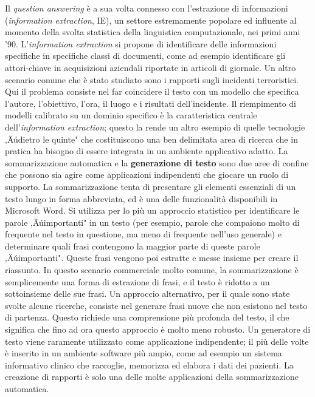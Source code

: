 \begin{multicols}{2}

Il \emph{question answering} \`{e} a sua volta connesso con l'estrazione di informazioni (\emph{information extraction}, IE), un settore estremamente popolare ed influente al momento della svolta statistica della linguistica computazionale, nei primi anni '90. L'\emph{information extraction} si propone di identificare delle informazioni specifiche in specifiche classi di documenti, come ad esempio identificare gli attori-chiave in acquisizioni aziendali riportate in articoli di giornale. Un altro scenario comune che \`{e} stato studiato sono i rapporti sugli incidenti terroristici. Qui il problema consiste nel far coincidere il testo con un modello che specifica l'autore, l'obiettivo, l'ora, il luogo e i risultati dell'incidente. Il riempimento di modelli calibrato su un dominio specifico \`{e} la caratteristica centrale dell'\emph{information extraction}; questo la rende un altro esempio di quelle tecnologie ‚Äúdietro le quinte" che costituiscono una ben delimitata area di ricerca che in pratica ha bisogno di essere integrata in un ambiente applicativo adatto.
La sommarizzazione automatica e la \textbf{generazione di testo} sono due aree di confine che possono sia agire come applicazioni indipendenti che giocare un ruolo di supporto. La sommarizzazione tenta di presentare gli elementi essenziali di un testo lungo in forma abbreviata, ed \`{e} una delle funzionalit\`{a} disponibili in Microsoft Word. Si utilizza per lo pi\`{u} un approccio statistico per identificare le parole ‚Äúimportanti" in un testo (per esempio, parole che compaiono molto di frequente nel testo in questione, ma meno di frequente nell'uso generale) e determinare quali frasi contengono la maggior parte di queste parole ‚Äúimportanti". Queste frasi vengono poi estratte e messe insieme per creare il riassunto. In questo scenario commerciale molto comune, la sommarizzazione \`{e} semplicemente una forma di estrazione di frasi, e il testo \`{e} ridotto a un sottoinsieme delle sue frasi. Un approccio alternativo, per il quale sono state svolte alcune ricerche, consiste nel generare frasi nuove che non esistono nel testo di partenza. Questo richiede una comprensione pi\`{u} profonda del testo, il che significa che fino ad ora questo approccio \`{e} molto meno robusto. Un generatore di testo viene raramente utilizzato come applicazione indipendente; il pi\`{u} delle volte \`{e} inserito in un ambiente software pi\`{u} ampio, come ad esempio un sistema informativo clinico che raccoglie, memorizza ed elabora i dati dei pazienti. La creazione di rapporti \`{e} solo una delle molte applicazioni della sommarizzazione automatica.


\end{multicols}
